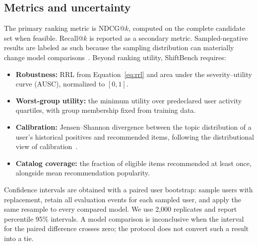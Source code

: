 \subsection{Metrics and uncertainty}

The primary ranking metric is NDCG@$k$, computed on the complete candidate set
when feasible.  Recall@$k$ is reported as a secondary metric.  Sampled-negative
results are labeled as such because the sampling distribution can materially
change model comparisons~\cite{Krichene2020}.  Beyond ranking utility, ShiftBench
requires:

\begin{itemize}[leftmargin=*,itemsep=2pt,topsep=3pt]
  \item \textbf{Robustness:} RRL from Equation~\ref{eq:rrl} and area under the
  severity--utility curve (AUSC), normalized to $[0,1]$.
  \item \textbf{Worst-group utility:} the minimum utility over predeclared user
  activity quartiles, with group membership fixed from training data.
  \item \textbf{Calibration:} Jensen--Shannon divergence between the topic
  distribution of a user's historical positives and recommended items, following
  the distributional view of calibration~\cite{Steck2018}.
  \item \textbf{Catalog coverage:} the fraction of eligible items recommended at
  least once, alongside mean recommendation popularity.
\end{itemize}

Confidence intervals are obtained with a paired user bootstrap: sample users
with replacement, retain all evaluation events for each sampled user, and apply
the same resample to every compared model.  We use 2,000 replicates and report
percentile 95\% intervals.  A model comparison is inconclusive when the interval
for the paired difference crosses zero; the protocol does not convert such a
result into a tie.
